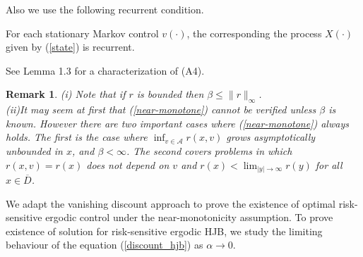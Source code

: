 \documentclass[11pt]{amsart}
\newtheorem{remark}{\bf Remark}[section]
\numberwithin{equation}{section}
\begin{document}
Also we use the following recurrent condition. 

 For each stationary Markov control $v(\cdot)$, the corresponding the process $X(\cdot)$ 
given by (\ref{state}) is recurrent.   

See Lemma 1.3 for  a characterization of (A4). 




\begin{remark}
(i) Note that if $r$ is bounded then $\beta \leq \|r\|_{\infty}$.\\
(ii)It may seem at first that (\ref{near-monotone}) cannot be verified unless $\beta$ is known. However there are two important 
cases where (\ref{near-monotone}) always holds. The first is the case where $ \displaystyle{ \inf_{v\in \mathcal A %
 } 
r(x,v) } $ grows
asymptotically unbounded in $x$, and $\beta<\infty$. The second covers problems in which $r(x,v)=r(x)$ does not depend on
$v$ and $\displaystyle{ r(x) < \lim_{ |y| \rightarrow \infty } r(y) } $ for all $x\in \overline{D}$.


\end{remark}

We adapt the vanishing discount approach to prove the existence of optimal risk-sensitive ergodic control 
under the near-monotonicity assumption. To prove existence of solution for risk-sensitive ergodic HJB, we study the limiting behaviour of the equation (\ref{discount_hjb})
 as $\alpha \longrightarrow 0$.
\end{document}
